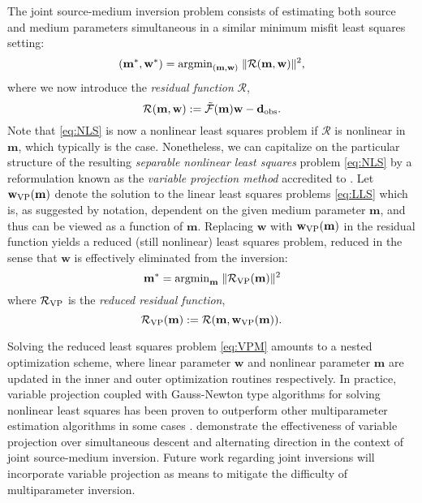 The joint source-medium inversion problem consists of estimating both source and medium parameters simultaneous in a similar minimum misfit least squares setting:
\begin{equation}\label{eq:NLS}
	(\mathbf m^*,\mathbf w^*) = {\rm argmin}_{\mathbf (\mathbf m,\mathbf w)} \;
		\| \mathcal R(\mathbf m,\mathbf w)\|^2,
\end{equation}
where we now introduce the {\em residual function} $\mathcal R$,
\[
	\mathcal R(\mathbf m,\mathbf w) := \tilde{\mathcal F}(\mathbf m)\mathbf w - \mathbf d_{\rm obs}.
\]
Note that \ref{eq:NLS} is now a nonlinear least squares problem if $\mathcal R$ is nonlinear in $\mathbf m$, which typically is the case. 
Nonetheless, we can capitalize on the particular structure of the resulting {\em separable nonlinear least squares} problem \ref{eq:NLS} by a reformulation known as the {\em variable projection method} accredited to \cite{GolubPereyra:73}.
Let $\mathbf w_{\rm VP}(\mathbf m)$ denote the solution to the linear least squares problems \ref{eq:LLS} which is, as suggested by notation, dependent on the given medium parameter $\mathbf m$, and thus can be viewed as a function of $\mathbf m$.
Replacing $\mathbf w$ with $\mathbf w_{\rm VP}(\mathbf m)$ in the residual function yields a reduced (still nonlinear) least squares problem, reduced in the sense that $\mathbf w$ is effectively eliminated from the inversion:
\begin{equation}\label{eq:VPM}
	\mathbf m^* = {\rm argmin}_{\mathbf m} \; \| \mathcal R_{\rm VP}(\mathbf m)\|^2
\end{equation}
where $\mathcal R_{\rm VP}$ is the {\em reduced residual function},
\begin{equation}\label{eq:VPMfun}
	\mathcal R_{\rm VP}(\mathbf m) := \mathcal R(\mathbf m,\mathbf w_{\rm VP}(\mathbf m)).
\end{equation}

Solving the reduced least squares problem \ref{eq:VPM} amounts to a nested optimization scheme, where linear parameter $\mathbf w$ and nonlinear parameter $\mathbf m$ are updated in the inner and outer optimization routines respectively.  
In practice, variable projection coupled with Gauss-Newton type algorithms for solving nonlinear least squares has been proven to outperform other multiparameter estimation algorithms in some cases \citep{Ruhe:1980}.
\cite{Rickett:SEG12} demonstrate the effectiveness of variable projection over simultaneous descent and alternating direction in the context of joint source-medium inversion.
Future work regarding joint inversions will incorporate variable projection as means to mitigate the difficulty of multiparameter inversion.

